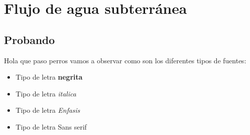 \chapter{Flujo de agua subterránea}

\section{Probando}
 Hola que paso perros vamos a observar como son los diferentes tipos de fuentes:
 \begin{itemize}
 \item Tipo de letra \textbf{negrita}
 \item Tipo de letra \textit{italica}
 \item Tipo de letra \emph{Enfasis}
 \item Tipo de letra \textsf{Sans serif}

 \end{itemize}
 


